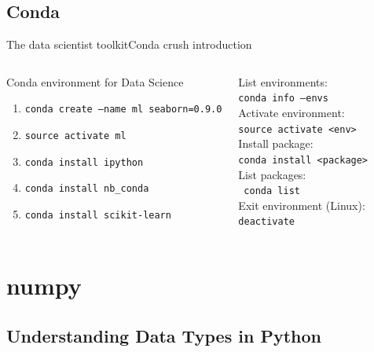 \documentclass[10pt,compress]{beamer} %
\begin{document}
\subsection{Conda}
\begin{frame}{The data scientist toolkit}{Conda crush introduction}
    \begin{columns}
	   \begin{block}{Conda environment for Data Science}
	   	\begin{enumerate}
			\item \texttt{conda create --name ml seaborn=0.9.0}
			\item \texttt{source activate ml}
			\item \texttt{conda install ipython}
			\item \texttt{conda install nb\_conda}
			\item \texttt{conda install scikit-learn}
		\end{enumerate}
	   \end{block}

		List environments: \\ \quad \texttt{conda info --envs}\\
		Activate environment: \\ \quad \texttt{source activate <env>}\\
		Install package: \\ \quad \texttt{conda install <package>}\\
		List packages: \\ \quad \texttt{conda list}\\
		Exit environment (Linux): \\ \quad \indent \texttt{deactivate}
	\end{columns}
\end{frame}

\section{numpy}

\subsection{Understanding Data Types in Python}
\end{document}
